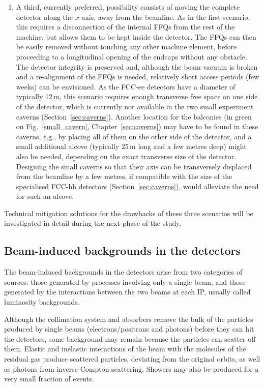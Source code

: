 \begin{enumerate}
\item A third, currently preferred, possibility consists of moving the complete detector along the $x$ axis, away from the beamline. 
As in the first scenario, this requires a disconnection of the internal FFQs from the rest of the machine, 
but allows them to be kept inside the detector. 
The FFQs can then be easily removed without touching any other machine element, 
before proceeding to a longitudinal opening of the endcaps without any obstacle. 
The detector integrity is preserved and, although the beam vacuum is broken and a re-alignment of the FFQs is needed, 
relatively short access periods (few weeks) can be envisioned. 
As the FCC-ee detectors have a diameter of typically 12\,m, 
this scenario requires enough transverse free space on one side of the detector, 
which is currently not available in the two small experiment caverns (Section~\ref{sec:caverns}). 
Another location for the balconies (in green on Fig.~\ref{small_cavern}, Chapter~\ref{sec:caverns}) may have to be found in these caverns, 
e.g., by placing all of them on the other side of the detector, 
and a small additional alcove (typically 25\,m long and a few metres deep) might also be needed, 
depending on the exact transverse size of the detector. 
Designing the small caverns so that their axis can be transversely displaced from the beamline by a few metres, 
if compatible with the size of the specialised FCC-hh detectors (Section~\ref{sec:caverns}), 
would alleviate the need for such an alcove.

\end{enumerate}

Technical mitigation solutions for the drawbacks of these three scenarios will be investigated in detail during the next phase of the study.

\subsection{Beam-induced backgrounds in the detectors}
\label{sec:MDI_backgrounds}

The beam-induced backgrounds in the detectors arise from two categories of sources: 
those generated by processes involving only a single beam, 
and those generated by the interactions between the two beams at each IP, usually called luminosity backgrounds.

Although the collimation system and absorbers remove the bulk of the particles produced by single beams 
(electrons/positrons and photons) 
before they can hit the detectors, 
some background may remain because the particles can scatter off them. 
Elastic and inelastic interactions of the beam with the molecules of the residual gas produce scattered particles, 
deviating from the original orbits, as well as photons from inverse-Compton scattering. 
Showers may also be produced for a very small fraction of events. 


